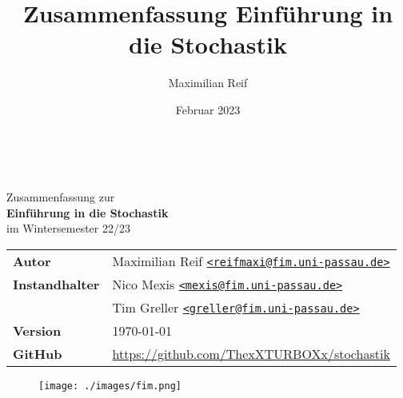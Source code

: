 \documentclass[11pt,a4paper,ngerman]{article}
\date{Februar 2023}
\author{Maximilian Reif}
\title{Zusammenfassung Einführung in die Stochastik}
\begin{document}
\begin{titlepage}
    \ \newline\newline\newline

  \begin{center}

  \huge Zusammenfassung zur\\
  \Huge\textbf{Einführung in die Stochastik}\\
  \huge im Wintersemester 22/23\\
  \normalsize

  \vspace{1cm}
  \begin{tabular}[b]{l|l}
  \textbf{Autor}         & Maximilian Reif
    \texttt{\href{mailto:reifmaxi@fim.uni-passau.de}{<reifmaxi@fim.uni-passau.de>}} \\
  \textbf{Instandhalter} & Nico Mexis
    \texttt{\href{mailto:mexis@fim.uni-passau.de}{<mexis@fim.uni-passau.de>}} \\
  & Tim Greller
    \texttt{\href{mailto:greller@fim.uni-passau.de}{<greller@fim.uni-passau.de>}} \\
  \textbf{Version}       & \today \\
  \textbf{GitHub}        & \url{https://github.com/ThexXTURBOXx/stochastik}
  \end{tabular}
  \vspace{1cm}

  \end{center}

  \tableofcontents

  \begin{figure}[b]
  \centering
  \texttt{[image: ./images/fim.png]}
  \end{figure}


\end{titlepage}

\setcounter{page}{1}







\end{document}

